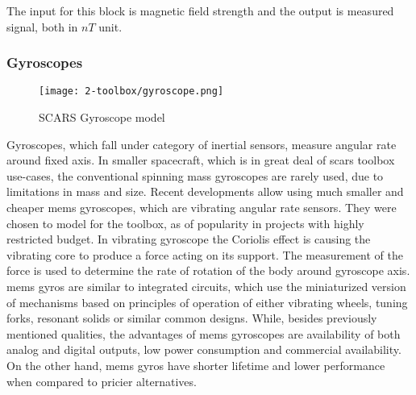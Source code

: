         The input for this block is magnetic field strength and the output is measured signal, both in $nT$ unit.


    \subsubsection{Gyroscopes}

        \begin{figure}[h]
            \centering
            \texttt{[image: 2-toolbox/gyroscope.png]}
            \caption{SCARS Gyroscope model}
            \label{fig:gryo_simulink}
        \end{figure}

        Gyroscopes, which fall under category of inertial sensors, measure angular rate around fixed axis. In smaller spacecraft, which is in great deal of \ac{scars} toolbox use-cases, the conventional spinning mass gyroscopes are rarely used, due to limitations in mass and size. Recent developments allow using much smaller and cheaper \ac{mems} gyroscopes, which are vibrating angular rate sensors. They were chosen to model for the toolbox, as of popularity in projects with highly restricted budget. \cite{armenise2010advances} In vibrating gyroscope the Coriolis effect is causing the vibrating core to produce a force acting on its support. The measurement of the force is used to determine the rate of rotation of the body around gyroscope axis. \ac{mems} gyros are similar to integrated circuits, which use the miniaturized version of mechanisms based on principles of operation of either vibrating wheels, tuning forks, resonant solids or similar common designs. \cite{bernstein2003overview} While, besides previously mentioned qualities, the advantages of \ac{mems} gyroscopes are availability of both analog and digital outputs, low power consumption and commercial availability. On the other hand, \ac{mems} gyros have shorter lifetime and lower performance when compared to pricier alternatives.

